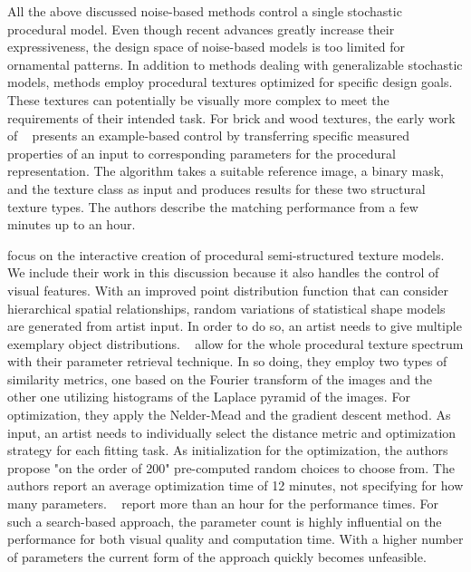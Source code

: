All the above discussed noise-based methods control a single stochastic procedural model. Even though recent advances greatly increase their expressiveness, the design space of noise-based models is too limited for ornamental patterns. In addition to methods dealing with generalizable stochastic models, methods employ procedural textures optimized for specific design goals. These textures can potentially be visually more complex to meet the requirements of their intended task. For brick and wood textures, the early work of \citeauthor*{lefebvre_2000_ass}~\cite{lefebvre_2000_ass} presents an example-based control by transferring specific measured properties of an input to corresponding parameters for the procedural representation. The algorithm takes a suitable reference image, a binary mask, and the texture class as input and produces results for these two structural texture types. The authors describe the matching performance from a few minutes up to an hour.

\cite{gilet_2012_map} focus on the interactive creation of procedural semi-structured texture models. We include their work in this discussion because it also handles the control of visual features. With an improved point distribution function that can consider hierarchical spatial relationships, random variations of statistical shape models are generated from artist input. In order to do so, an artist needs to give multiple exemplary object distributions.
 \citeauthor*{bourque_2004_ptm}~\cite{bourque_2004_ptm} allow for the whole procedural texture spectrum with their parameter retrieval technique. In so doing, they employ two types of similarity metrics, one based on the Fourier transform of the images and the other one utilizing histograms of the Laplace pyramid of the images. For optimization, they apply the Nelder-Mead and the gradient descent method. As input, an artist needs to individually select the distance metric and optimization strategy for each fitting task. As initialization for the optimization, the authors propose "on the order of 200" pre-computed random choices to choose from. The authors report an average optimization time of 12 minutes, not specifying for how many parameters. \citeauthor*{gilet_2012_mkn}~\cite{gilet_2012_mkn} report more than an hour for the performance times. For such a search-based approach, the parameter count is highly influential on the performance for both visual quality and computation time. With a higher number of parameters the current form of the approach quickly becomes unfeasible.


